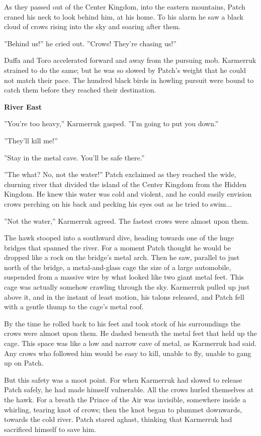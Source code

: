 \documentclass[11pt]{article}
\begin{document}
As they passed out of the Center Kingdom, into the eastern mountains, Patch craned his neck to look behind him, at his home. To his alarm he saw a black cloud of crows rising into the sky and soaring after them.\par
''Behind us!'' he cried out. ''Crows! They're chasing us!''\par
Daffa and Toro accelerated forward and away from the pursuing mob. Karmerruk strained to do the same; but he was so slowed by Patch's weight that he could not match their pace. The hundred black birds in howling pursuit were bound to catch them before they reached their destination.\par
\par
{\bf River East\par
}\par
 ''You're too heavy,'' Karmerruk gasped. ''I'm going to put you down.''\par
 ''They'll kill me!''\par
 ''Stay in the metal cave. You'll be safe there.''\par
 ''The what? No, not the water!'' Patch exclaimed as they reached the wide, churning river that divided the island of the Center Kingdom from the Hidden Kingdom. He knew this water was cold and violent, and he could easily envision crows perching on his back and pecking his eyes out as he tried to swim...\par
 ''Not the water,'' Karmerruk agreed. The fastest crows were almost upon them.\par
The hawk stooped into a southward dive, heading towards one of the huge bridges that spanned the river. For a moment Patch thought he would be dropped like a rock on the bridge's metal arch. Then he saw, parallel to just north of the bridge, a metal-and-glass cage the size of a large automobile, suspended from a massive wire by what looked like two giant metal feet. This cage was actually somehow crawling through the sky. Karmerruk pulled up just above it, and in the instant of least motion, his talons released, and Patch fell with a gentle thump to the cage's metal roof.\par
 By the time he rolled back to his feet and took stock of his surroundings the crows were almost upon them. He dashed beneath the metal feet that held up the cage. This space was like a low and narrow cave of metal, as Karmerruk had said. Any crows who followed him would be easy to kill, unable to fly, unable to gang up on Patch.\par
But this safety was a moot point. For when Karmerruk had slowed to release Patch safely, he had made himself vulnerable. All the crows hurled themselves at the hawk. For a breath the Prince of the Air was invisible, somewhere inside a whirling, tearing knot of crows; then the knot began to plummet downwards, towards the cold river. Patch stared aghast, thinking that Karmerruk had sacrificed himself to save him.\par
\end{document}
